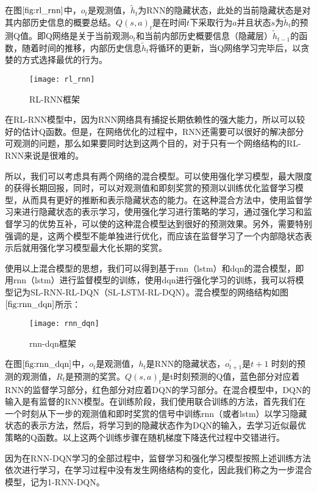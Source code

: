 在图$\ref{fig:rl_rnn}$中，$o_{t}$是观测值，$\tilde{h}_{t}$为RNN的隐藏状态，此处的当前隐藏状态是对其内部历史信息的概要总结。$Q(s,a)_{t}$是在时间$t$下采取行为$a$并且状态$s$为$\tilde{h}_{t}$的预测Q值。即Q网络是关于当前观测$o_{t}$和当前内部历史概要信息（隐藏层）$\tilde{h}_{t-1}$的函数，随着时间的推移，内部历史信息$\tilde{h}_{t}$将循环的更新，当Q网络学习完毕后，以贪婪的方式选择最优的行为。
\begin{figure}[htbp]
\centering
\texttt{[image: rl\_rnn]}
\caption{RL-RNN框架}
\label{fig:rl_rnn}
\end{figure}

在RL-RNN模型中，因为RNN网络具有捕捉长期依赖性的强大能力，所以可以较好的估计Q函数。但是，在网络优化的过程中，RNN还需要可以很好的解决部分可观测的问题，那么如果要同时达到这两个目的，对于只有一个网络结构的RL-RNN来说是很难的。

所以，我们可以考虑具有两个网络的混合模型。可以使用强化学习模型，最大限度的获得长期回报，同时，可以对观测值和即刻奖赏的预测以训练优化监督学习模型，从而具有更好的推断和表示隐藏状态的能力。在这种混合方法中，使用监督学习来进行隐藏状态的表示学习，使用强化学习进行策略的学习，通过强化学习和监督学习的优势互补，可以使的这种混合模型达到很好的预测效果。另外，需要特别强调的是，这两个模型不能单独进行优化，而应该在监督学习了一个内部隐状态表示后就用强化学习模型最大化长期的奖赏。

使用以上混合模型的思想，我们可以得到基于rnn（lstm）和dqn的混合模型，即用rnn（lstm）进行监督模型的训练，使用dqn进行强化学习的训练，我可以将模型记为SL-RNN-RL-DQN（SL-LSTM-RL-DQN）。混合模型的网络结构如图$\ref{fig:rnn_dqn}$所示：
\begin{figure}[htbp]
\centering
\texttt{[image: rnn\_dqn]}
\caption{rnn-dqn框架}
\label{fig:rnn_dqn}
\end{figure}

在图$\ref{fig:rnn_dqn}$中，$o_{t}$是观测值，$h_{t}$是RNN的隐藏状态，$o_{t+1}^{'}$是$t+1$ 时刻的预测的观测值，$R_{t}$是预测的奖赏。$Q(s,a)_{t}$是t时刻预测的Q值，蓝色部分对应着RNN的监督学习部分，红色部分对应着DQN的学习部分。在混合模型中，DQN的输入是有监督的RNN模型。在训练阶段，我们使用联合训练的方法，首先我们在一个时刻从下一步的观测值和即时奖赏的信号中训练rnn（或者lstm）以学习隐藏状态的表示方法，然后，将学习到的隐藏状态作为DQN的输入，去学习近似最优策略的Q函数。以上这两个训练步骤在随机梯度下降迭代过程中交错进行。

因为在RNN-DQN学习的全部过程中，监督学习和强化学习模型按照上述训练方法依次进行学习，在学习过程中没有发生网络结构的变化，因此我们称之为一步混合模型，记为1-RNN-DQN。

